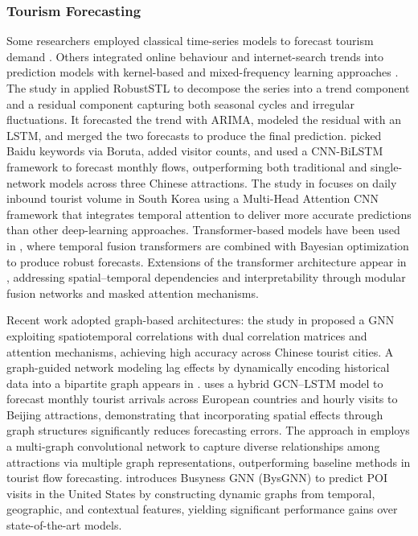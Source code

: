 \documentclass[journal]{IEEEtran}
\begin{document}
\subsubsection{Tourism Forecasting}


Some researchers employed classical time-series models to forecast tourism demand \cite{nunez2024machine}. Others integrated online behaviour and internet-search trends into prediction models with kernel-based and mixed-frequency learning approaches \cite{hu2025tourism}. The study in \cite{li2024forecasting} applied RobustSTL to decompose the series into a trend component and a residual component capturing both seasonal cycles and irregular fluctuations. It forecasted the trend with ARIMA, modeled the residual with an LSTM, and merged the two forecasts to produce the final prediction. \cite{chen2024forecasting} picked Baidu keywords via Boruta, added visitor counts, and used a CNN-BiLSTM framework to forecast monthly flows, outperforming both traditional and single-network models across three Chinese attractions.
The study in \cite{kim2021daily} focuses on daily inbound tourist volume in South Korea using a Multi-Head Attention CNN framework that integrates temporal attention to deliver more accurate predictions than other deep-learning approaches. Transformer-based models have been used in \cite{li2024enhancing}, where temporal fusion transformers are combined with Bayesian optimization to produce robust forecasts. Extensions of the transformer architecture appear in \cite{chen2025tourism}, addressing spatial–temporal dependencies and interpretability through modular fusion networks and masked attention mechanisms.


Recent work adopted graph-based architectures: the study in \cite{liang2025tourism} proposed a GNN exploiting spatiotemporal correlations with dual correlation matrices and attention mechanisms, achieving high accuracy across Chinese tourist cities. A graph-guided network modeling lag effects by dynamically encoding historical data into a bipartite graph appears in \cite{fan2023graph}. \cite{li2022tourism} uses a hybrid GCN–LSTM model to forecast monthly tourist arrivals across European countries and hourly visits to Beijing attractions, demonstrating that incorporating spatial effects through graph structures significantly reduces forecasting errors. The approach in \cite{wang2021multi} employs a multi-graph convolutional network to capture diverse relationships among attractions via multiple graph representations, outperforming baseline methods in tourist flow forecasting. \cite{hajisafi2023learning} introduces Busyness GNN (BysGNN) to predict POI visits in the United States by constructing dynamic graphs from temporal, geographic, and contextual features, yielding significant performance gains over state-of-the-art models.
\end{document}
